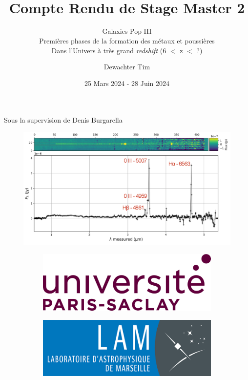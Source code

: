 \documentclass[12pt, a4paper]{article}
\title{\textbf{ \\{\Huge Compte Rendu de Stage Master 2}}}
\subtitle{Galaxies Pop III\\ Premières phases de la formation des métaux et poussières\\ Dans l'Univers à très grand \textit{redshift} (6 $<$ z $<$ ?)}
\author{Dewachter Tim}
\date{25 Mars 2024 - 28 Juin 2024}
\begin{document}
\maketitle

\centerline{
Sous la supervision de Denis Burgarella
}

\begin{figure}[H]
  \centering
  \includegraphics[width=\textwidth]{assets/P5_s01518_extracted.png}
\end{figure}

\begin{figure}
  \centering
     \begin{subfigure}[b]{0.3\textwidth}
         \centering
         \includegraphics[width=\textwidth]{assets/paris-saclay.png}
     \end{subfigure}
     \hfill
     \begin{subfigure}[b]{0.3\textwidth}
         \centering
         \includegraphics[width=\textwidth]{assets/lam.png}
     \end{subfigure}
\end{figure}
\end{document}
